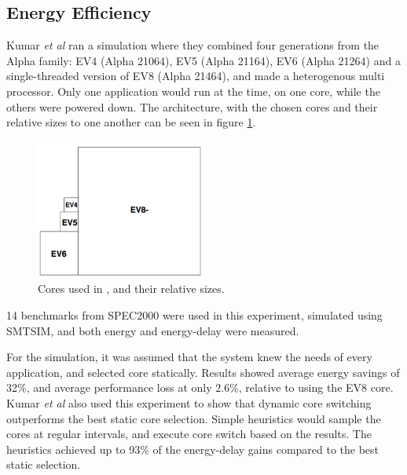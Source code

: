 
\subsection{Energy Efficiency}
\label{subsec:rw_ee} 
Kumar \textit{et al}\cite{heterogeneous-ee} ran a simulation where they combined four generations from the Alpha family: EV4 (Alpha 21064), EV5 (Alpha 21164), EV6 (Alpha 21264) and a single-threaded version of EV8 (Alpha 21464), and made a heterogenous multi processor.
Only one application would run at the time, on one core, while the others were powered down.
The architecture, with the chosen cores and their relative sizes to one another can be seen in figure
\ref{fig:Kumar1}.

\begin{figure}[htb]
    \centering
    \includegraphics[width=0.5\textwidth]{Figures/Heterogeneous/Kumar1}
    \caption{Cores used in \cite{heterogeneous-ee}, and their relative sizes.}
    \label{fig:Kumar1}
\end{figure}


14 benchmarks from SPEC2000 were used in this experiment, simulated using SMTSIM, and both energy and energy-delay were measured.

For the simulation, it was assumed that the system knew the needs of every application, and selected core statically. 
Results showed average energy savings of 32\%, and average performance loss at only 2.6\%, relative to using the EV8 core.
Kumar \textit{et al} also used this experiment to show that dynamic core switching outperforms the best static core selection.
Simple heuristics would sample the cores at regular intervals, and execute core switch based on the results.
The heuristics achieved up to 93\% of the energy-delay gains compared to the best static selection. 

